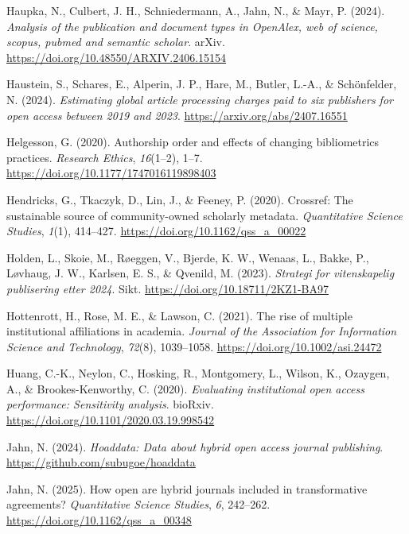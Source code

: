 \documentclass[a4paper,man,floatsintext,longtable,noextraspace,10pt]{apa6}
\newlength{\cslhangindent}
\newenvironment{CSLReferences}[2] %
{\begin{list}{}{%
  \setlength{\itemindent}{0pt}
  \setlength{\leftmargin}{0pt}
  \setlength{\parsep}{0pt}
  \ifodd #1
  \setlength{\leftmargin}{\cslhangindent}
  \setlength{\itemindent}{-1\cslhangindent}
  \fi
  \setlength{\itemsep}{#2\baselineskip}}}
{\end{list}}
\begin{document}
\begin{CSLReferences}{1}{0}
Haupka, N., Culbert, J. H., Schniedermann, A., Jahn, N., \& Mayr, P.
(2024). \emph{Analysis of the publication and document types in
OpenAlex, web of science, scopus, pubmed and semantic scholar}. arXiv.
\url{https://doi.org/10.48550/ARXIV.2406.15154}

Haustein, S., Schares, E., Alperin, J. P., Hare, M., Butler, L.-A., \&
Schönfelder, N. (2024). \emph{Estimating global article processing
charges paid to six publishers for open access between 2019 and 2023}.
\url{https://arxiv.org/abs/2407.16551}

Helgesson, G. (2020). Authorship order and effects of changing
bibliometrics practices. \emph{Research Ethics}, \emph{16}(1--2), 1--7.
\url{https://doi.org/10.1177/1747016119898403}

Hendricks, G., Tkaczyk, D., Lin, J., \& Feeney, P. (2020). Crossref: The
sustainable source of community-owned scholarly metadata.
\emph{Quantitative Science Studies}, \emph{1}(1), 414--427.
\url{https://doi.org/10.1162/qss_a_00022}

Holden, L., Skoie, M., Røeggen, V., Bjerde, K. W., Wenaas, L., Bakke,
P., Løvhaug, J. W., Karlsen, E. S., \& Qvenild, M. (2023).
\emph{Strategi for vitenskapelig publisering etter 2024}. Sikt.
\url{https://doi.org/10.18711/2KZ1-BA97}

Hottenrott, H., Rose, M. E., \& Lawson, C. (2021). The rise of multiple
institutional affiliations in academia. \emph{Journal of the Association
for Information Science and Technology}, \emph{72}(8), 1039--1058.
\url{https://doi.org/10.1002/asi.24472}

Huang, C.-K., Neylon, C., Hosking, R., Montgomery, L., Wilson, K.,
Ozaygen, A., \& Brookes-Kenworthy, C. (2020). \emph{Evaluating
institutional open access performance: Sensitivity analysis}. bioRxiv.
\url{https://doi.org/10.1101/2020.03.19.998542}

Jahn, N. (2024). \emph{Hoaddata: Data about hybrid open access journal
publishing}. \url{https://github.com/subugoe/hoaddata}

Jahn, N. (2025). How open are hybrid journals included in transformative
agreements? \emph{Quantitative Science Studies}, \emph{6}, 242--262.
\url{https://doi.org/10.1162/qss_a_00348}


\end{CSLReferences}
\end{document}
